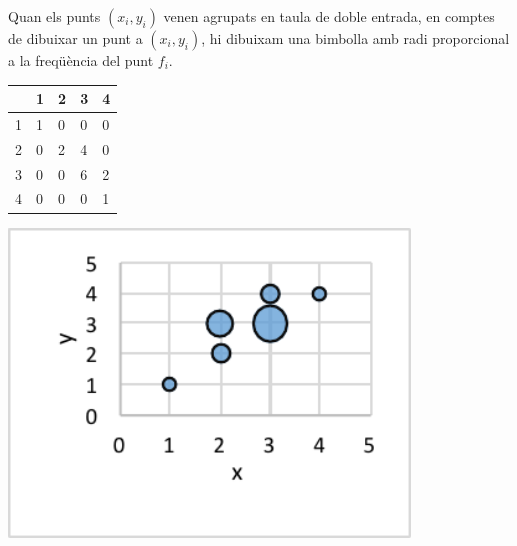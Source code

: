  
\begin{theorybox}
	Quan els punts $(x_i, y_i)$ venen agrupats en taula de doble entrada, en comptes de dibuixar un punt a  $(x_i, y_i)$, hi dibuixam una bimbolla amb radi proporcional a la freqüència del punt $f_i$.
	\begin{minipage}{0.6\textwidth}
		\begin{center}
			\begin{tabular}{|p{0.42in}|p{0.2in}|p{0.2in}|p{0.2in}|p{0.2in}|}
				\hline
				\rowcolor{lightgray} \diagbox{$x_i$}{$y_i$} & 1 & 2 & 3 & 4  \\ \hline
				\cellcolor{lightgray}	1 & 1 & 0 & 0 &  0 \\ \hline
				\cellcolor{lightgray}	2 & 0  &2  & 4 & 0  \\ \hline
				\cellcolor{lightgray}	3 & 0  &0  & 6 & 2  \\ \hline
				\cellcolor{lightgray}	4 & 0  &0  & 0 &  1 \\ \hline
			\end{tabular}
		\end{center}
	\end{minipage}
	\begin{minipage}{0.4\textwidth}
		\begin{center}
			\includegraphics[width=0.8\textwidth]{img-11/nuvol-bimbolles}
		\end{center}
	\end{minipage}
\end{theorybox}

